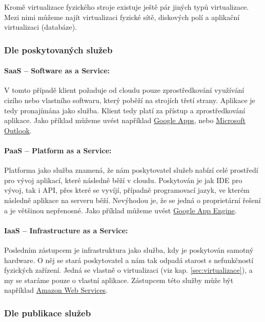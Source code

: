 Kromě virtualizace fyzického stroje existuje ještě pár jiných typů virtualizace. Mezi nimi můžeme najít virtualizaci fyzické sítě, diskových polí a aplikační virtualizaci (databáze).

\subsubsection{Dle poskytovaných služeb}

\paragraph{SaaS -- Software as a Service:}
\label{sec:saas}
V tomto případě klient požaduje od cloudu pouze zprostředkování využívání cizího nebo vlastního softwaru, který poběží na strojích třetí strany. Aplikace je tedy pronajímána jako služba. Klient tedy platí za přístup a zprostředkování aplikace. Jako příklad můžeme uvést například \href{apps.google.com}{Google Apps}, nebo \href{http://domains.live.com}{Microsoft Outlook}.

\paragraph{PaaS -- Platform as a Service:}
\label{sec:paas}
Platforma jako služba znamená, že nám poskytovatel služeb nabízí celé prostředí pro vývoj aplikací, které následně běží v cloudu. Poskytován je jak IDE pro vývoj, tak i API, přes které se vyvíjí, případně programovací jazyk, ve kterém následně aplikace na serveru běží. Nevýhodou je, že se jedná o proprietární řešení a je většinou nepřenosné. Jako příklad můžeme uvést \href{appengine.google.com}{Google App Engine}.

\paragraph{IaaS -- Infrastructure as a Service:}
\label{sec:iaas}
Posledním zástupcem je infrastruktura jako služba, kdy je poskytován samotný hardware. O něj se stará poskytovatel a nám tak odpadá starost s nefunkčností fyzických zařízení. Jedná se vlastně o virtualizaci (viz kap. \ref{sec:virtualizace}), a my se staráme pouze o vlastní aplikace. Zástupcem této služby může být například \href{http://aws.amazon.com/}{Amazon Web Services}.

\subsubsection{Dle publikace služeb}

